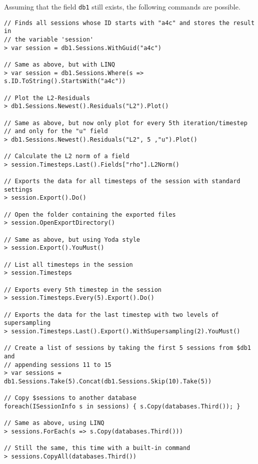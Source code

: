 Assuming that the field \lstinline{db1} still exists, the following commands are possible.
\begin{lstlisting}[title=Advanced Examples]
// Finds all sessions whose ID starts with "a4c" and stores the result in
// the variable 'session'
> var session = db1.Sessions.WithGuid("a4c")

// Same as above, but with LINQ
> var session = db1.Sessions.Where(s => s.ID.ToString().StartsWith("a4c"))

// Plot the L2-Residuals
> db1.Sessions.Newest().Residuals("L2").Plot()

// Same as above, but now only plot for every 5th iteration/timestep
// and only for the "u" field
> db1.Sessions.Newest().Residuals("L2", 5 ,"u").Plot()

// Calculate the L2 norm of a field
> session.Timesteps.Last().Fields["rho"].L2Norm()

// Exports the data for all timesteps of the session with standard settings
> session.Export().Do()

// Open the folder containing the exported files
> session.OpenExportDirectory()

// Same as above, but using Yoda style
> session.Export().YouMust()

// List all timesteps in the session
> session.Timesteps

// Exports every 5th timestep in the session
> session.Timesteps.Every(5).Export().Do()

// Exports the data for the last timestep with two levels of supersampling
> session.Timesteps.Last().Export().WithSupersampling(2).YouMust()

// Create a list of sessions by taking the first 5 sessions from $db1 and 
// appending sessions 11 to 15
> var sessions = db1.Sessions.Take(5).Concat(db1.Sessions.Skip(10).Take(5))

// Copy $sessions to another database
foreach(ISessionInfo s in sessions) { s.Copy(databases.Third()); }

// Same as above, using LINQ
> sessions.ForEach(s => s.Copy(databases.Third()))

// Still the same, this time with a built-in command
> sessions.CopyAll(databases.Third())

\end{lstlisting}

